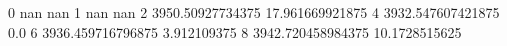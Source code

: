 0 nan nan
1 nan nan
2 3950.50927734375 17.961669921875
4 3932.547607421875 0.0
6 3936.459716796875 3.912109375
8 3942.720458984375 10.1728515625
